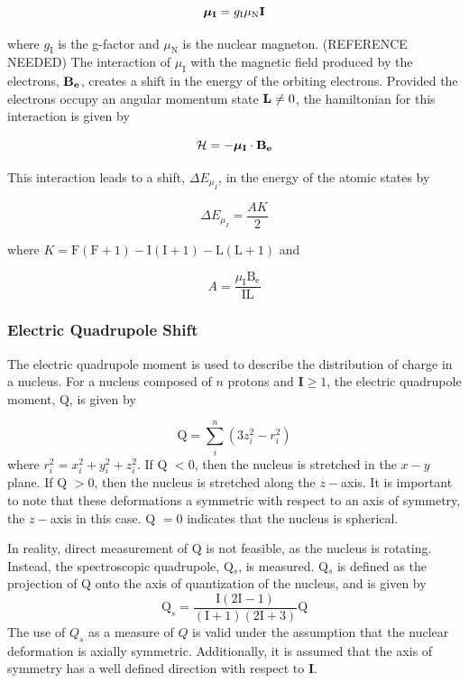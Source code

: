 \documentclass[12pt,a4paper,margin=1in]{report}
\begin{document}
\begin{equation}
\boldsymbol{\mu}_{\mathrm{\bf{I}}} = g_{\mathrm{I}}\mu_{\mathrm{N}}\mathrm{\bf{I}}
\end{equation}

where $g_{\mathrm{I}}$ is the g-factor and $\mu_{\mathrm{N}}$ is the nuclear magneton. (REFERENCE NEEDED) The interaction of $\mu_{\mathrm{I}}$ with the magnetic field produced by the electrons, $\mathrm{\bf{B_e}}$, creates a shift in the energy of the orbiting electrons. Provided the electrons occupy an angular momentum state $\mathrm{\bf{L}} \neq 0$, the hamiltonian for this interaction is given by

\begin{equation}
\mathcal{H} = -\boldsymbol{\mu}_{\mathrm{\bf{I}}} \cdot \mathrm{\bf{B_e}}
\end{equation}

This interaction leads to a shift, $\Delta E_{\mu_I}$, in the energy of the atomic states by

\begin{equation}
\Delta E_{\mu_I} = \frac{AK}{2}
\end{equation}

where $K = \mathrm{F(F+1) - I(I+1) - L(L+1)}$ and 

\begin{equation}
A = \frac{\mu_{\mathrm{I}}\mathrm{B_e}}{\mathrm{IL}}
\end{equation}

\subsubsection*{Electric Quadrupole Shift}
The electric quadrupole moment is used to describe the distribution of charge in a nucleus. For a nucleus composed of $n$ protons and $\mathbf{I}\geq1$, the electric quadrupole moment, Q, is given by

\begin{equation}
\mathrm{Q} = \sum_i^n (3z_i^2-r_i^2)
\end{equation}
where $r_i^2 = x_i^2+y_i^2+z_i^2$. If Q $ < 0$, then the nucleus is stretched in the $x-y$ plane. If Q $ > 0$, then the nucleus is stretched along the $z-$axis. It is important to note that these deformations a symmetric with respect to an axis of symmetry, the $z-$axis in this case. Q $=0$ indicates that the nucleus is spherical. 

In reality, direct measurement of Q is not feasible, as the nucleus is rotating. Instead, the spectroscopic quadrupole, Q$_s$, is measured. Q$_s$ is defined as the projection of Q onto the axis of quantization of the nucleus, and is given by
\begin{equation}
\mathrm{Q}_s = \frac{\mathrm{I}(2\mathrm{I}-1)}{(\mathrm{I}+1)(2\mathrm{I}+3)}\mathrm{Q}
\end{equation}
The use of $Q_s$ as a measure of $Q$ is valid under the assumption that the nuclear deformation is axially symmetric. Additionally, it is assumed that the axis of symmetry has a well defined direction with respect to \textbf{I}.
\end{document}
